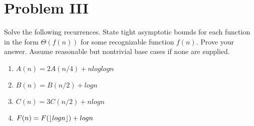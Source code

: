 \section{Problem III}
 Solve the following recurrences. State tight asymptotic bounds for each function in the form $\Theta(f(n))$ for some recognizable function $f(n)$. Prove your answer. Assume reasonable but nontrivial base cases if none are supplied.

\begin{enumerate}[label=(\alph*)]
	\item $A(n)=2A(n/4)+nloglogn$
	\item $B(n) = B(n/2) + log n$
	\item $C(n)=3C(n/2)+nlogn$
	\item $F(n)=F(\floor*{logn})+logn$
\end{enumerate}